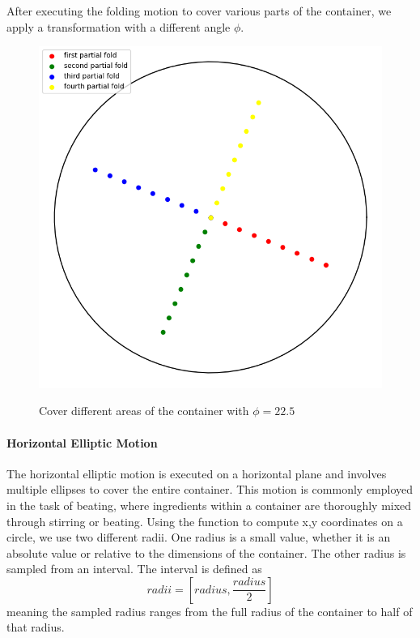 After executing the folding motion to cover various parts of the container, we apply a transformation with a different angle $\phi$.

\begin{figure}[H]
    \includegraphics[scale=0.35]{Graphics/motions/folding1.png}
    \centering
    \label{fig:foldingMotion1}
    \caption{Cover different areas of the container with $\phi=22.5$}
\end{figure}

\paragraph{Horizontal Elliptic Motion}
The horizontal elliptic motion is executed on a horizontal plane and involves multiple ellipses to cover the entire container.
This motion is commonly employed in the task of beating, where ingredients within a container are thoroughly mixed through stirring or beating.
\newline
\newline
Using the function to compute x,y coordinates on a circle, we use two different radii.
One radius is a small value, whether it is an absolute value or relative to the dimensions of the container. The other radius is sampled from an interval. 
The interval is defined as \[radii = [radius, \frac{radius} {2} ]\]
meaning the sampled radius ranges from the full radius of the container to half of that radius.

